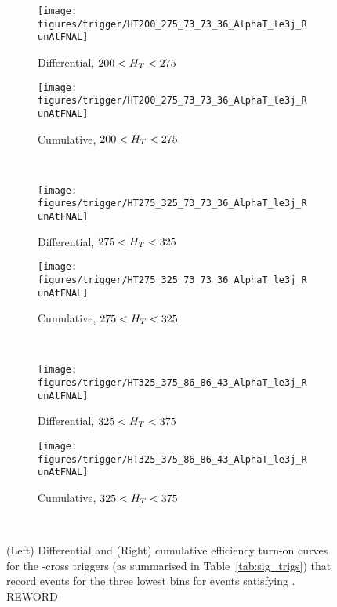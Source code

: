 \begin{figure}[!ht]
  \centering
    
    \begin{subfigure}[b]{0.48\textwidth}
      \texttt{[image: figures/trigger/HT200\_275\_73\_73\_36\_AlphaT\_le3j\_RunAtFNAL]}
      \caption{Differential, $200 < H_T < 275 $\gev}
    \end{subfigure}
    \begin{subfigure}[b]{0.48\textwidth}
      \texttt{[image: figures/trigger/HT200\_275\_73\_73\_36\_AlphaT\_le3j\_RunAtFNAL]}
      \caption{Cumulative, $200 < H_T < 275 $\gev}
    \end{subfigure} \\
    \begin{subfigure}[b]{0.48\textwidth}
      \texttt{[image: figures/trigger/HT275\_325\_73\_73\_36\_AlphaT\_le3j\_RunAtFNAL]}
      \caption{Differential, $275 < H_T < 325 $\gev}
    \end{subfigure}
    \begin{subfigure}[b]{0.48\textwidth}
      \texttt{[image: figures/trigger/HT275\_325\_73\_73\_36\_AlphaT\_le3j\_RunAtFNAL]}
      \caption{Cumulative, $275 < H_T < 325 $\gev}
    \end{subfigure} \\
    \begin{subfigure}[b]{0.48\textwidth}
      \texttt{[image: figures/trigger/HT325\_375\_86\_86\_43\_AlphaT\_le3j\_RunAtFNAL]}
      \caption{Differential, $325 < H_T < 375 $\gev}
    \end{subfigure}
    \begin{subfigure}[b]{0.48\textwidth}
      \texttt{[image: figures/trigger/HT325\_375\_86\_86\_43\_AlphaT\_le3j\_RunAtFNAL]}
      \caption{Cumulative, $325 < H_T < 375 $\gev}
    \end{subfigure} \\
  
    \caption{\label{fig:eff_alphat_le3j}
      (Left) Differential and (Right) cumulative efficiency turn-on
      curves for the \HT-\alphat cross triggers (as summarised in
      Table~\ref{tab:sig_trigs}) that record events for the
      three lowest \HT bins  for events satisfying \njlow. REWORD
    }
\end{figure}

